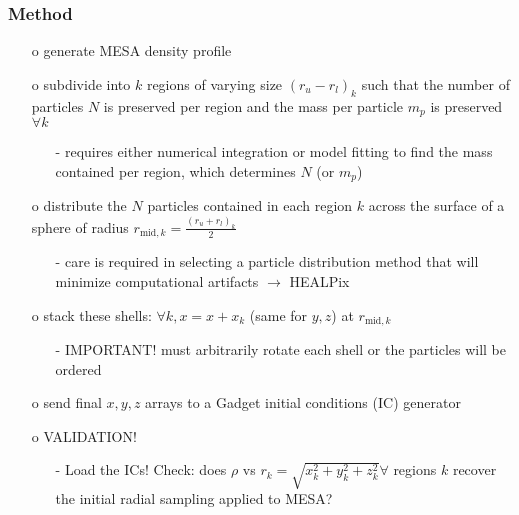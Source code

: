 \documentclass{beamer}
\begin{document}
\begin{frame}
\frametitle{\small Method}
{\footnotesize
\begin{itemize}
\item[o] generate MESA density profile


\item[o] subdivide into $k$ regions of varying size $(r_u - r_l)_{k}$ such that the number of particles $N$ is preserved per region and the mass per particle $m_p$ is preserved $\forall k$ 
	\begin{itemize}
		\item[-]\footnotesize requires either numerical integration or model fitting to find the mass contained per region, which determines $N$ (or $m_p$)
	\end{itemize}	

\item[o] distribute the $N$ particles contained in each region $k$ across the surface of a sphere of radius  $r_{\text{mid},k} = \frac{(r_u + r_l)_k}{2}$ 
	\begin{itemize}
		\item[-]\footnotesize care is required in selecting a particle distribution method that will minimize computational artifacts $\rightarrow$ HEALPix
	\end{itemize}	

\item[o] stack these shells: $\forall k, x = x+x_{k}$ (same for $y, z$) at $r_{\text{mid},k}$
	\begin{itemize}
		\item[-] \footnotesize IMPORTANT! must arbitrarily rotate each shell or the particles will be ordered
	\end{itemize}

\item[o] send final $x, y, z$ arrays to a Gadget initial conditions (IC) generator 

\item[o] VALIDATION!
	\begin{itemize}
		\item[-]\footnotesize Load the ICs! Check: does $\rho$ vs $r_k=\sqrt{x_k^2 + y_k^2 + z_k^2} \forall$ regions $k$ recover the initial radial sampling applied to MESA?
	\end{itemize}

\end{itemize}
}
\end{frame}
\end{document}
